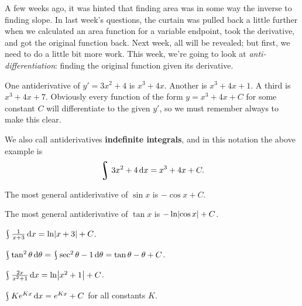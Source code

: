 


A few weeks ago, it was hinted that finding area was in some way the inverse to finding slope. In last
week's questions, the curtain was pulled back a little further when we calculated an area function for a variable endpoint, took
the derivative, and got the original function back. Next week, all will be revealed; but first, we need to do a little bit more
work. This week, we're going to look at \textit{anti-differentiation}: finding the original function given its derivative.

\begin{ex}
  One antiderivative of $ y' = 3x^2 + 4 $ is $ x^3 + 4x $. Another is $ x^3 + 4x + 1 $. A third is $ x^3 + 4x + 7 $. Obviously
  every function of the form $ y = x^3 + 4x + C $ for some constant $ C $ will differentiate to the given $ y' $, so we must remember
  always to make this clear.
\end{ex}

We also call antiderivatives \textbf{indefinite integrals}, and in this notation the above example is
\begin{displaymath}
  \rint 3x^2 + 4 \dif{x} = x^3 + 4x + C.
\end{displaymath}

\begin{ex}
  The most general antiderivative of $ \sin x $ is $ -\cos x + C $.
\end{ex}

\begin{ex}
  The most general antiderivative of $ \tan x $ is $ -\ln \abs{\cos x} + C $.
\end{ex}

\begin{ex}
  $ \rint \frac{1}{x + 3} \dif{x} = \ln \abs{x + 3} + C $.
\end{ex}

\begin{ex}
  $ \rint \tan^2 \theta \dif{\theta} = \rint \sec^2 \theta - 1 \dif{\theta} = \tan \theta - \theta + C $.
\end{ex}

\begin{ex}
  $ \rint \frac{2x}{x^2 + 1} \dif{x} = \ln \abs{x^2 + 1} + C $.
\end{ex}

\begin{ex}
  $ \rint Ke^{Kx} \dif{x} = e^{Kx} + C $ for all constants $ K $.
\end{ex}

